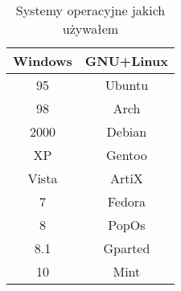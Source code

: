 \documentclass[a4paper]{article}
\begin{document}
\begin{center}
    
\begin{table}[h]
\centering\caption{Systemy operacyjne jakich używałem}
	\begin{tabular}{|c|c|}
	\hline
	Windows & GNU+Linux\\
	\hline
	95& Ubuntu\\
	\hline
	98 & Arch \\
	\hline
	2000 & Debian \\
	\hline
	XP & Gentoo\\
	\hline
	Vista & ArtiX\\
	\hline
	7 & Fedora \\
	\hline
	8 & PopOs \\
	\hline
	8.1 & Gparted \\
	\hline
	10 & Mint \\
	\hline	
	\end{tabular}
\end{table}



\end{center}
\end{document}
